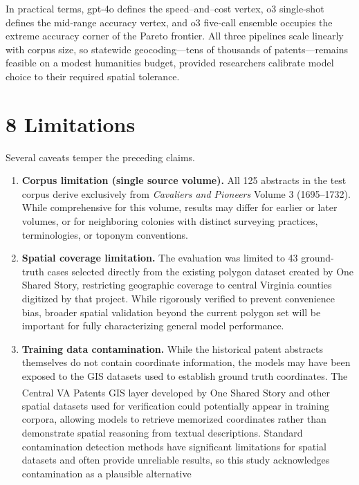 \documentclass[
  10pt]{article}
\begin{document}
In practical terms, gpt-4o defines the speed--and--cost vertex, o3
single-shot defines the mid-range accuracy vertex, and o3 five-call
ensemble occupies the extreme accuracy corner of the Pareto frontier.
All three pipelines scale linearly with corpus size, so statewide
geocoding---tens of thousands of patents---remains feasible on a modest
humanities budget, provided researchers calibrate model choice to their
required spatial tolerance.

\section{8 Limitations}\label{limitations}

Several caveats temper the preceding claims.

\begin{enumerate}
\def\labelenumi{\arabic{enumi}.}
\item
  \textbf{Corpus limitation (single source volume).} All 125 abstracts
  in the test corpus derive exclusively from \emph{Cavaliers and
  Pioneers} Volume 3 (1695--1732). While comprehensive for this volume,
  results may differ for earlier or later volumes, or for neighboring
  colonies with distinct surveying practices, terminologies, or toponym
  conventions.
\item
  \textbf{Spatial coverage limitation.} The evaluation was limited to 43
  ground-truth cases selected directly from the existing polygon dataset
  created by One Shared Story, restricting geographic coverage to
  central Virginia counties digitized by that project. While rigorously
  verified to prevent convenience bias, broader spatial validation
  beyond the current polygon set will be important for fully
  characterizing general model performance.
\item
  \textbf{Training data contamination.} While the historical patent
  abstracts themselves do not contain coordinate information, the models
  may have been exposed to the GIS datasets used to establish ground
  truth coordinates. The Central VA Patents GIS layer developed by One
  Shared
  Story\textsuperscript{} and
  other spatial datasets used for verification could potentially appear
  in training corpora, allowing models to retrieve memorized coordinates
  rather than demonstrate spatial reasoning from textual descriptions.
  Standard contamination detection methods have significant limitations
  for spatial datasets and often provide unreliable results, so this
  study acknowledges contamination as a plausible alternative

\end{enumerate}
\end{document}
